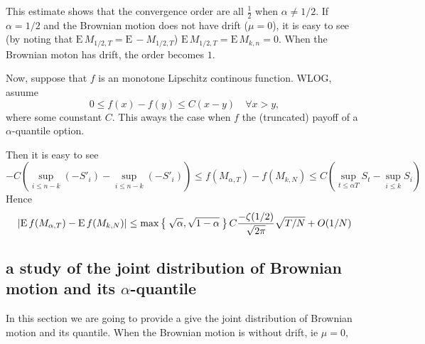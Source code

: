 \documentclass[11pt]{book}
\def\abs#1{{\left|#1\right|}}
\def\E{{\mathrm{E}\,}}
\begin{document}
This estimate shows that the convergence order 
are all $\frac{1}{2}$ when $\alpha \neq 1/2$. If $\alpha=1/2$ and the 
Brownian motion does not have  drift ($\mu=0$), it is easy to see 
(by noting that 
$\E M_{1/2,T} = \E -M_{1/2,T}$) $\E M_{1/2,T} = \E M_{k,n} = 0$. 
When the Brownian moton has drift, the order becomes $1$. 

Now, suppose that $f$ is an monotone Lipschitz continous function.
WLOG, asuume 
\begin{equation}\label{eq:lips}
0 \leq f(x)-f(y) \leq C (x-y) \quad \forall x>y,
\end{equation}
where some counstant $C$. This aways the case when $f$ the 
(truncated) payoff of a $\alpha$-quantile option.

Then it is easy to see
\[
-C\left( \sup_{i\leq n-k} (-S'_i)-\sup_{i\leq n-k} (-S'_i)\right)
 \leq f(M_{\alpha,T}) - f(M_{k,N}) 
\leq  C \left(\sup_{t\leq \alpha{T}} S_t - \sup_{i\leq k} S_i\right)
\]
Hence 
\[
\abs{\E f(M_{\alpha,T}) - \E f(M_{k,N})} 
\leq \max\Set{\sqrt{\alpha}, \sqrt{1-\alpha}}
C\frac{-\zeta(1/2)}{\sqrt{2\pi}}\sqrt{T/N}  + O(1/N)
\]


\subsection{a study of the joint distribution of Brownian motion and its $\alpha$-quantile}
In this section we are going to provide a give the joint distribution of Brownian motion and its quantile. When the Brownian motion is without drift, ie $\mu = 0 $, 







{}

\end{document}
